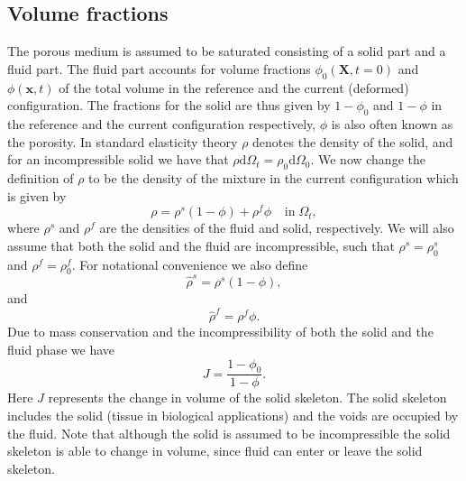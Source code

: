 


\subsection{Volume fractions}
The porous medium is assumed to be saturated consisting of a solid part and a fluid part. The fluid part accounts for volume fractions $\phi_{0}(\boldsymbol{X},t=0)$ and $\phi(\boldsymbol{x},t)$ of the total volume in the reference and the current (deformed) configuration. The fractions for the solid are thus given by $1-\phi_{0}$ and $1-\phi$ in the reference and the current configuration respectively, $\phi$ is also often known as the porosity. In standard elasticity theory $\rho$ denotes the density of the solid, and for an incompressible solid we have that $\rho\mbox{d}\Omega_{t} = \rho_{0}\mbox{d}\Omega_{0}$. We now change the definition of $\rho$ to be the density of the {mixture} in the current configuration which is given by
\begin{equation}
\rho=\rho^{s}(1-\phi) + \rho^{f}\phi \;\;\;\ \mbox{in} \; \Omega_{t},
\label{rho_mixture} 
\end{equation}
\noindent where $\rho^{s}$ and $\rho^{f}$ are the densities of the fluid and solid, respectively. We will also assume that both the solid and the fluid are incompressible, such that $\rho^{s}=\rho^{s}_{0}$ and $
\rho^{f}=\rho^{f}_{0}$. For notational convenience we also define 
\begin{equation}
\hat\rho^{s}=\rho^{s}(1-\phi),
\label{eqn:rhos_hat}
\end{equation}
and
\begin{equation}
\hat\rho^{f}=\rho^{f}\phi. 
\label{eqn:rhof_hat}
\end{equation}
Due to mass conservation and the incompressibility of both the solid and the fluid phase we have
\begin{equation}
J = \frac{1-\phi_{0}}{1-\phi}.
\label{incomp_mixture} 
\end{equation}
Here $J$ represents the change in volume of the solid skeleton. The solid skeleton includes the solid (tissue in biological applications) and the voids are occupied by the fluid. Note that although the solid is assumed to be incompressible the solid skeleton is able to change in volume, since fluid can enter or leave the solid skeleton.
